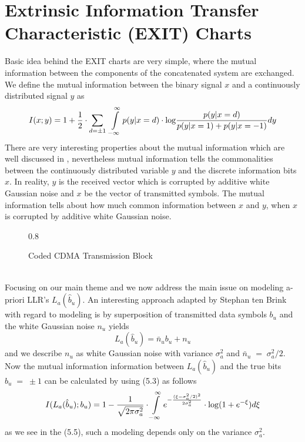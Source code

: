 \section{Extrinsic Information Transfer Characteristic (EXIT) Charts}
Basic idea behind the EXIT charts are very simple, where the mutual information between the components of the concatenated system are exchanged. We define the mutual information between the binary signal $x$ and a continuously distributed signal $y$ as
\begin{equation}
I(x;y)=1+\frac{\hbox{$1$}}{\hbox{$2$}}\cdot \sum\limits_{d=\pm 1}\;\int\limits_{-\infty}^{\infty}p(y\vert x = d)\cdot \mathrm{log}\frac{\hbox{$p(y\vert x = d)$}}{\hbox{$p(y\vert x= 1)+p(y\vert x =-1)$}}dy
\end{equation}
There are very interesting properties about the mutual information which are well discussed in \cite{TC91}, nevertheless mutual information tells the commonalities between the continuously distributed variable $y$ and the discrete information bits $x$. In reality, $y$ is the received vector which is corrupted by additive white Gaussian noise and $x$ be the vector of transmitted symbols. The mutual information tells about how much common information between $x$ and $y$, when $x$ is corrupted by additive white Gaussian noise.
\begin{figure}[htb]
\centerline{  {0.8} }
\caption{Coded CDMA Transmission Block}
\end{figure}\\
Focusing on our main theme and we now address the main issue on modeling a-priori LLR's $L_a(\hat{b}_u)$. An interesting approach adapted by Stephan ten Brink \cite{TEN} with regard to modeling is by superposition of transmitted data symbols $b_u$ and the white Gaussian noise $n_u$ yields
\begin{equation}
L_a(\hat{b}_u)=\bar{n}_u b_u + n_u
\end{equation}
and we describe $n_u$ as white Gaussian noise with variance $\sigma_a^2$ and $\bar{n}_u\;=\;\sigma_a^2/2$. Now the mutual information information between $L_a(\hat{b}_u)$ and the true bits $b_u\;=\;\pm 1$ can be calculated by using (5.3) as follows
\begin{equation}
I(L_a(\hat{b}_u);b_u)=1-\frac{\hbox{$1$}}{\hbox{$\sqrt{2\pi\sigma_a^2}$}}\cdot\int\limits_{-\infty}^{\infty}e^{-\frac{(\xi-\sigma_a^2/2)^2}{2\sigma_a^2}}\cdot \mathrm{log}(1+e^{-\xi})d\xi
\end{equation}
as we see in the (5.5), such a modeling depends only on the variance $\sigma_a^2$.\\ \\
